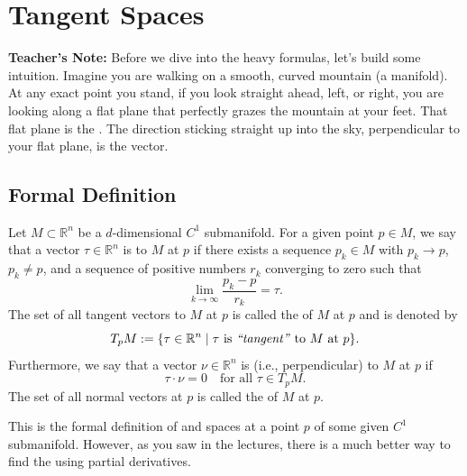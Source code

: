 \section{Tangent Spaces} %

\noindent
\textbf{Teacher's Note:} Before we dive into the heavy formulas, let's build some intuition. Imagine you are walking on a smooth, curved mountain (a manifold). At any exact point you stand, if you look straight ahead, left, or right, you are looking along a flat plane that perfectly grazes the mountain at your feet. That flat plane is the . The direction sticking straight up into the sky, perpendicular to your flat plane, is the  vector. 

\subsection{Formal Definition}

\setcounter{savedSec}{\value{section}}
\setcounter{savedThm}{\value{theorem}}
\setcounter{section}{12}
\setcounter{theorem}{12} 

\begin{theorem} %
Let $M \subset \mathbb{R}^n$ be a $d$-dimensional $C^1$ submanifold. %
For a given point $p \in M$, we say that a vector $\tau \in \mathbb{R}^n$ is  to $M$ at $p$ if there exists a sequence $p_k \in M$ with $p_k \to p$, $p_k \neq p$, and a sequence of positive numbers $r_k$ converging to zero such that %
\[
\lim_{k \to \infty} \frac{p_k - p}{r_k} = \tau. %
\]
The set of all tangent vectors to $M$ at $p$ is called the  of $M$ at $p$ and is denoted by %
\[
T_pM := \{ \tau \in \mathbb{R}^n \mid \tau \text{ is \qt{tangent} to } M \text{ at } p \}. %
\]
Furthermore, we say that a vector $\nu \in \mathbb{R}^n$ is  (i.e., perpendicular) to $M$ at $p$ if %
\[
\tau \cdot \nu = 0 \quad \text{for all } \tau \in T_pM. %
\]
The set of all normal vectors at $p$ is called the  of $M$ at $p$. %
\end{theorem}

\setcounter{section}{\value{savedSec}}
\setcounter{theorem}{\value{savedThm}}

This is the formal definition of  and  spaces at a point $p$ of some given $C^1$ submanifold. However, as you saw in the lectures, there is a much better way to find the  using partial derivatives.


